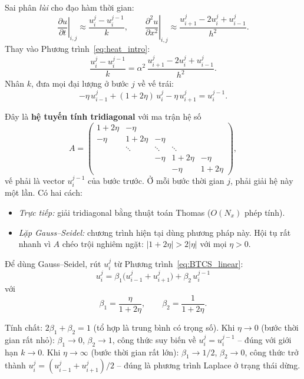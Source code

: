 \documentclass[12pt,a4paper]{article}
\begin{document}
Sai phân \emph{lùi} cho đạo hàm thời gian:
\[
    \left.\frac{\partial u}{\partial t}\right|_{i,j} \approx \frac{u_i^j - u_i^{j-1}}{k}, \qquad
    \left.\frac{\partial^2 u}{\partial x^2}\right|_{i,j} \approx \frac{u_{i+1}^j - 2u_i^j + u_{i-1}^j}{h^2}.
\]
Thay vào Phương trình~\eqref{eq:heat_intro}:
\[
    \frac{u_i^j - u_i^{j-1}}{k} = \alpha^2\,\frac{u_{i+1}^j - 2u_i^j + u_{i-1}^j}{h^2}.
\]
Nhân $k$, đưa mọi đại lượng ở bước $j$ về vế trái:
\begin{equation}
    -\eta\,u_{i-1}^j + (1 + 2\eta)\,u_i^j - \eta\,u_{i+1}^j = u_i^{j-1}.
    \label{eq:BTCS_linear}
\end{equation}

Đây là \textbf{hệ tuyến tính tridiagonal} với ma trận hệ số
\[
    A = \begin{pmatrix}
        1+2\eta & -\eta & & & \\
        -\eta & 1+2\eta & -\eta & & \\
        & \ddots & \ddots & \ddots & \\
        & & -\eta & 1+2\eta & -\eta \\
        & & & -\eta & 1+2\eta
    \end{pmatrix},
\]
vế phải là vector $u_i^{j-1}$ của bước trước. Ở mỗi bước thời gian $j$, phải giải hệ này một lần. Có hai cách:
\begin{itemize}
    \item \emph{Trực tiếp:} giải tridiagonal bằng thuật toán Thomas ($O(N_x)$ phép tính).
    \item \emph{Lặp Gauss--Seidel:} chương trình hiện tại dùng phương pháp này. Hội tụ rất nhanh vì $A$ chéo trội nghiêm ngặt: $|1+2\eta| > 2|\eta|$ với mọi $\eta > 0$.
\end{itemize}

Để dùng Gauss--Seidel, rút $u_i^j$ từ Phương trình~\eqref{eq:BTCS_linear}:
\begin{equation}
    \boxed{\; u_i^j = \beta_1\bigl(u_{i-1}^j + u_{i+1}^j\bigr) + \beta_2\,u_i^{j-1} \;}
    \label{eq:BTCS_GS}
\end{equation}
với
\begin{equation}
    \beta_1 = \frac{\eta}{1 + 2\eta}, \qquad
    \beta_2 = \frac{1}{1 + 2\eta}.
    \label{eq:beta}
\end{equation}

Tính chất: $2\beta_1 + \beta_2 = 1$ (tổ hợp là trung bình có trọng số). Khi $\eta \to 0$ (bước thời gian rất nhỏ): $\beta_1 \to 0$, $\beta_2 \to 1$, công thức suy biến về $u_i^j = u_i^{j-1}$ -- đúng với giới hạn $k \to 0$. Khi $\eta \to \infty$ (bước thời gian rất lớn): $\beta_1 \to 1/2$, $\beta_2 \to 0$, công thức trở thành $u_i^j = (u_{i-1}^j + u_{i+1}^j)/2$ -- đúng là phương trình Laplace ở trạng thái dừng.
\end{document}
